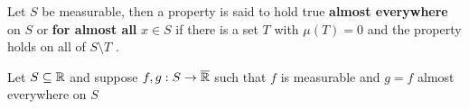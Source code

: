 \begin{definition}
	Let \(S\)	 be measurable, then a property is  said to hold true \textbf{almost everywhere} on \(S\)	 or \textbf{for almost all}	 \(x \in S\)	if there is a set \(T\)	 with \(\mu\left( T \right) = 0\)	 and the property holds on all of \(S \setminus T\)	.
\end{definition}
\begin{proposition}
	Let \(S \subseteq \mathbb{R}\) and suppose \(f, g: S \to \overline{\mathbb{R}}\) such that \(f\) is measurable and \(g=f\) almost everywhere on \(S\)



\end{proposition}
